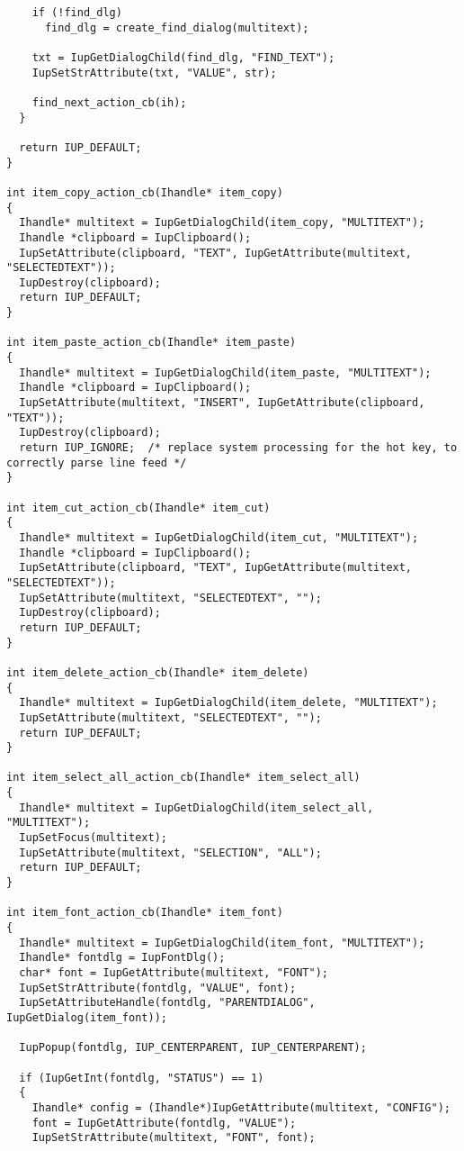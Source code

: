 \documentclass{ctexart}
\begin{document}
\begin{lstlisting}
    if (!find_dlg)
      find_dlg = create_find_dialog(multitext);

    txt = IupGetDialogChild(find_dlg, "FIND_TEXT");
    IupSetStrAttribute(txt, "VALUE", str);

    find_next_action_cb(ih);
  }

  return IUP_DEFAULT;
}

int item_copy_action_cb(Ihandle* item_copy) 
{
  Ihandle* multitext = IupGetDialogChild(item_copy, "MULTITEXT");
  Ihandle *clipboard = IupClipboard();
  IupSetAttribute(clipboard, "TEXT", IupGetAttribute(multitext, "SELECTEDTEXT"));
  IupDestroy(clipboard);
  return IUP_DEFAULT;
}

int item_paste_action_cb(Ihandle* item_paste) 
{
  Ihandle* multitext = IupGetDialogChild(item_paste, "MULTITEXT");
  Ihandle *clipboard = IupClipboard();
  IupSetAttribute(multitext, "INSERT", IupGetAttribute(clipboard, "TEXT"));
  IupDestroy(clipboard);
  return IUP_IGNORE;  /* replace system processing for the hot key, to correctly parse line feed */
}

int item_cut_action_cb(Ihandle* item_cut) 
{
  Ihandle* multitext = IupGetDialogChild(item_cut, "MULTITEXT");
  Ihandle *clipboard = IupClipboard();
  IupSetAttribute(clipboard, "TEXT", IupGetAttribute(multitext, "SELECTEDTEXT"));
  IupSetAttribute(multitext, "SELECTEDTEXT", "");
  IupDestroy(clipboard);
  return IUP_DEFAULT;
}

int item_delete_action_cb(Ihandle* item_delete) 
{
  Ihandle* multitext = IupGetDialogChild(item_delete, "MULTITEXT");
  IupSetAttribute(multitext, "SELECTEDTEXT", "");
  return IUP_DEFAULT;
}

int item_select_all_action_cb(Ihandle* item_select_all) 
{
  Ihandle* multitext = IupGetDialogChild(item_select_all, "MULTITEXT");
  IupSetFocus(multitext);
  IupSetAttribute(multitext, "SELECTION", "ALL");
  return IUP_DEFAULT;
}

int item_font_action_cb(Ihandle* item_font)
{
  Ihandle* multitext = IupGetDialogChild(item_font, "MULTITEXT");
  Ihandle* fontdlg = IupFontDlg();
  char* font = IupGetAttribute(multitext, "FONT");
  IupSetStrAttribute(fontdlg, "VALUE", font);
  IupSetAttributeHandle(fontdlg, "PARENTDIALOG", IupGetDialog(item_font));

  IupPopup(fontdlg, IUP_CENTERPARENT, IUP_CENTERPARENT);

  if (IupGetInt(fontdlg, "STATUS") == 1)
  {
    Ihandle* config = (Ihandle*)IupGetAttribute(multitext, "CONFIG");
    font = IupGetAttribute(fontdlg, "VALUE");
    IupSetStrAttribute(multitext, "FONT", font);


\end{lstlisting}
\end{document}
